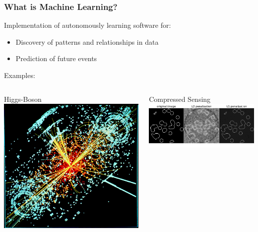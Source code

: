 \documentclass[10pt]{beamer}
\begin{document}
  \begin{frame}[t]\frametitle{What is Machine Learning?}
	  	Implementation of autonomously learning software for:
        \begin{itemize}
        	\item Discovery of patterns and relationships in data
        	\item Prediction of future events
        \end{itemize}
        \alert{Examples:}
        \begin{columns}[T]
        	\begin{column}{.25\textwidth}
        		Higgs-Boson\\
        		\includegraphics[width = \linewidth]{CMS_Higgs-event.jpg}
        	\end{column}\hfill
        	\begin{column}{.25\textwidth}
        		Compressed Sensing\\
        		\includegraphics[width = \linewidth]{plot_tomography_l1_reconstruction_001.png}

\end{column}
\end{columns}
\end{frame}
\end{document}
